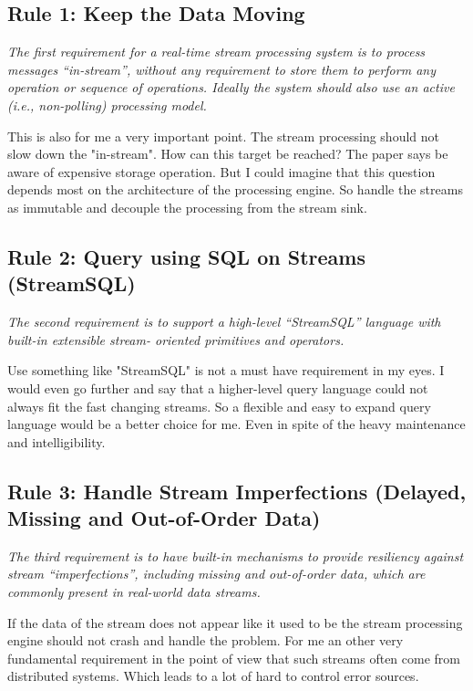 \subsection{Rule 1: Keep the Data Moving}
\textit{The first requirement for a real-time stream processing
        system is to process messages “in-stream”, without any
        requirement to store them to perform any operation or
        sequence of operations. Ideally the system should also use
        an active (i.e., non-polling) processing model.}

\medskip
This is also for me a very important point. The stream processing should not slow down the "in-stream".
How can this target be reached? The paper says be aware of expensive storage operation.
But I could imagine that this question depends most on the architecture of the processing engine.
So handle the streams as immutable and decouple the processing from the stream sink.


\subsection{Rule 2: Query using SQL on Streams (StreamSQL)}
\textit{The second requirement is to support a high-level
        “StreamSQL” language with built-in extensible stream-
        oriented primitives and operators.}

\medskip
Use something like "StreamSQL" is not a must have requirement in my eyes.
I would even go further and say that a higher-level query language could not always fit the fast changing streams.
So a flexible and easy to expand query language would be a better choice for me.
Even in spite of the heavy maintenance and intelligibility.

\newpage
\subsection{Rule 3: Handle Stream Imperfections (Delayed, Missing
and Out-of-Order Data)}
\textit{The third requirement is to have built-in mechanisms to
        provide resiliency against stream “imperfections”,
        including missing and out-of-order data, which are
        commonly present in real-world data streams.}

\medskip
If the data of the stream does not appear like it used to be the stream processing engine should not crash and handle the problem.
For me an other very fundamental requirement in the point of view that such streams often come from distributed systems.
Which leads to a lot of hard to control error sources.

